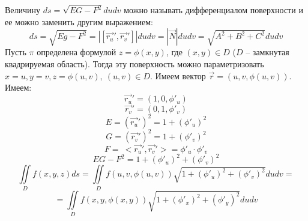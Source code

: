 \documentclass[../../main.tex]{subfiles}
\begin{document}
    \begin{rem}
    Величину $ds = \sqrt{EG - F^2} du dv$ можно называть
     дифференциалом поверхности и ее можно заменить другим выражением:
    \[ds = \sqrt{Eg - F^2} = |[\overrightarrow{r_u}', \overrightarrow{r_v}']| 
    du dv =
     |\overrightarrow{N}| du dv = \sqrt{A^2 + B^2 + C^2} du dv \] 	
    Пусть $\pi$ определена формулой $z= \phi(x,y)$, где $(x,y) \in D$ ($D$ \---
     замкнутая квадрируемая область). Тогда эту поверхность можно 
     параметризовать
      $x=u, y = v, z= \phi(u,v), \ (u, v) \in D$. Имеем вектор 
      $\overrightarrow{r} =
       (u, v, \phi(u,v))$. Имеем:
    \[\overrightarrow{r_u}' = (1, 0, \phi'_u) \] 
    \[\overrightarrow{r_v}' = (0, 1, \phi'_v)\]
	\[E =(\overrightarrow{r_u}')^2 = 1 + (\phi'_u)^2\]
	\[G =(\overrightarrow{r_v}')^2 = 1 + (\phi'_v)^2\]
	\[F = \ <\overrightarrow{r_u}', \overrightarrow{r_v}'> = \phi'_u \cdot 
	\phi'_v\]
	\[EG - F^2 = 1 + (\phi'_u)^2 + (\phi'_v)^2 \]
	\[\iint \limits_D f(x, y, z)ds = \iint \limits_D f(u,v, \phi(u,v)) \sqrt{1 +
		 (\phi'_u)^2 + (\phi'_v)^2} dudv = \] \[= \iint \limits_D f(x,y, \phi(x,y))
	  \sqrt{1 + (\phi'_x)^2 + (\phi'_y)^2} dudv \]
	\end{rem}
\end{document}
